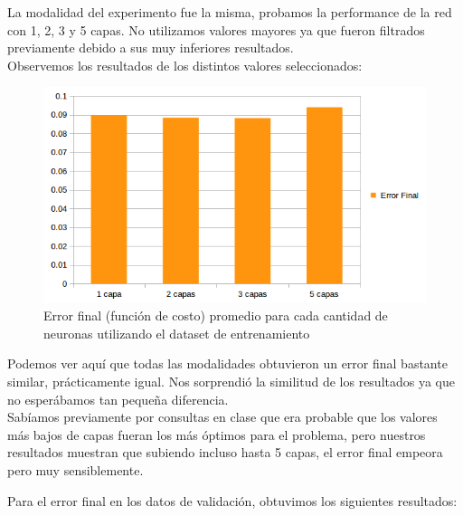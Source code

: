 La modalidad del experimento fue la misma, probamos la performance de la red con 1, 2, 3 y 5 capas. No utilizamos valores mayores ya que fueron filtrados previamente debido a sus muy inferiores resultados.\\

Observemos los resultados de los distintos valores seleccionados:\\

\begin{figure}[h]
  \begin{center}
  \includegraphics[scale=0.75]{graficos/ej2_cant_capas_error_final.png}
  \caption{Error final (función de costo) promedio para cada cantidad de neuronas utilizando el dataset de entrenamiento}
  \end{center}
\end{figure}

Podemos ver aquí que todas las modalidades obtuvieron un error final bastante similar, prácticamente igual. Nos sorprendió la similitud de los resultados ya que no esperábamos tan pequeña diferencia.\\
Sabíamos previamente por consultas en clase que era probable que los valores más bajos de capas fueran los más óptimos para el problema, pero nuestros resultados muestran que subiendo incluso hasta 5 capas, el error final empeora pero muy sensiblemente.

Para el error final en los datos de validación, obtuvimos los siguientes resultados:\\

